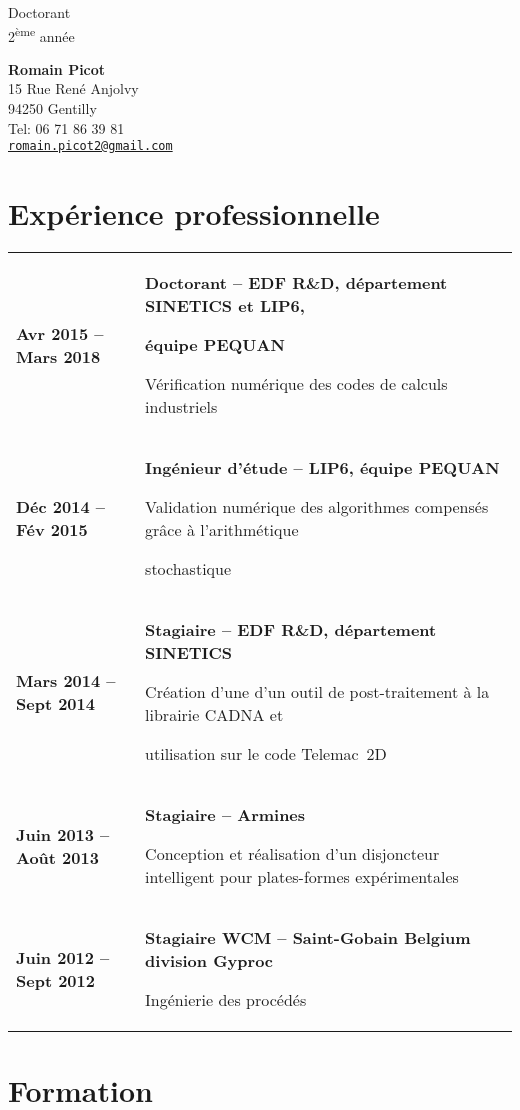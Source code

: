 \documentclass[10pt]{article}
\makeatletter
\newlength{\sidewidth}
\newlength{\mainwidth}
\newenvironment{CVtable}
{%
  \begin{tabular}
    {@{}>{\bfseries}p{\sidewidth}@{}>{\ding{229} \RaggedRight}p{\mainwidth}@{}}%
}
{\end{tabular}}
\makeatother
\begin{document}
\begin{raggedright}
\Huge Doctorant \\
\LARGE 2\textsuperscript{ème} année
\end{raggedright}

\vspace{-2cm}
\begin{raggedleft}
  \textbf{Romain Picot}\\
  15 Rue René Anjolvy \\
  94250 Gentilly \\
  Tel: 06 71 86 39 81 \\
  \href{mailto:romain.picot2@gmail.com}{\texttt{romain.picot2@gmail.com}}\\
\end{raggedleft}

\section{Expérience professionnelle}

\begin{CVtable}
  Avr 2015 -- Mars 2018 & \textbf{Doctorant -- EDF R\&D, département
    SINETICS et LIP6,}\par\textbf{équipe PEQUAN}\par
  Vérification numérique des codes de calculs industriels\\
  Déc 2014 -- Fév 2015 &  \textbf{Ingénieur d'étude -- LIP6, équipe PEQUAN}\par Validation numérique des algorithmes compensés grâce à l'arithmétique\par stochastique \\
  Mars 2014 -- Sept 2014 &  \textbf{Stagiaire -- EDF R\&D, département SINETICS}\par Création d'une d'un outil de post-traitement à la librairie CADNA et\par utilisation sur le code Telemac~2D\\
  Juin 2013 -- Août 2013 &  \textbf{Stagiaire -- Armines}\par Conception et réalisation d'un disjoncteur intelligent pour plates-formes expérimentales \\
  Juin 2012 -- Sept 2012 & \textbf{Stagiaire WCM -- Saint-Gobain
    Belgium division Gyproc}\par
  Ingénierie des procédés\\
\end{CVtable}

\section{Formation}
\end{document}
